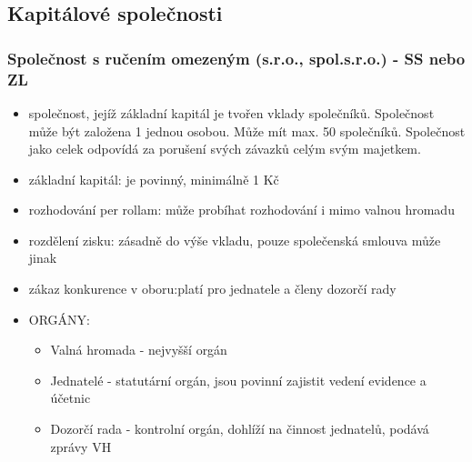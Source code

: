 \documentclass[11pt,a4paper,twoside]{book}
\begin{document}
			\subsection{Kapitálové společnosti}
				\subsubsection{Společnost s ručením omezeným (s.r.o., spol.s.r.o.) - SS nebo ZL}
					\begin{itemize}
						\item společnost, jejíž základní kapitál je tvořen vklady společníků. Společnost může být založena 1 jednou osobou. Může mít max. 50 společníků. Společnost jako celek odpovídá za porušení svých závazků celým svým majetkem.
						\item základní kapitál: je povinný, minimálně 1 Kč
						\item rozhodování per rollam: může probíhat rozhodování i mimo valnou hromadu
						\item rozdělení zisku: zásadně do výše vkladu, pouze společenská smlouva může jinak
						\item zákaz konkurence v oboru:platí pro jednatele a členy dozorčí rady					
						\item ORGÁNY:
							\begin{itemize}
								\item Valná hromada - nejvyšší orgán
								\item Jednatelé - statutární orgán, jsou povinní zajistit vedení evidence a účetnic
								\item Dozorčí rada - kontrolní orgán, dohlíží na činnost jednatelů, podává zprávy VH
							\end{itemize}
					\end{itemize}
\end{document}
